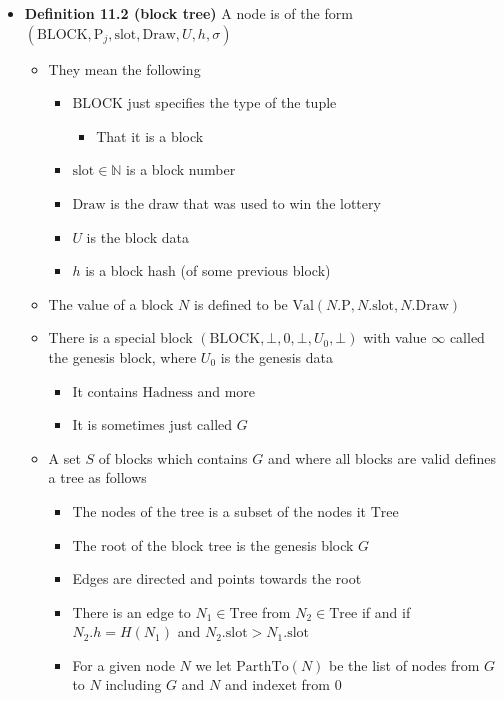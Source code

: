 \documentclass[11pt]{article}
\begin{document}
\begin{itemize}
\item \textbf{Definition 11.2 (block tree)} A node is of the form \((\text{BLOCK}, \text{P}_j, \text{slot}, \text{Draw}, U,h, \sigma)\)
\begin{itemize}
\item They mean the following
\begin{itemize}
\item \(\text{BLOCK}\) just specifies the type of the tuple
\begin{itemize}
\item That it is a block
\end{itemize}
\item \(\text{slot} \in \mathbb N\) is a block number
\item \(\text{Draw}\) is the draw that was used to win the lottery
\item \(U\) is the block data
\item \(h\) is a block hash (of some previous block)
\end{itemize}
\item The value of a block \(N\) is defined to be \(\text{Val}(N.\text{P}, N.\text{slot}, N.\text{Draw})\)
\item There is a special block \((\text{BLOCK}, \bot, 0, \bot, U_0, \bot)\) with value \(\infty\) called the genesis block, where \(U_0\) is the genesis data
\begin{itemize}
\item It contains \(\text{Hadness}\) and more
\item It is sometimes just called \(G\)
\end{itemize}
\item A set \(S\) of blocks which contains \(G\) and where all blocks are valid defines a tree as follows
\begin{itemize}
\item The nodes of the tree is a subset of the nodes it \(\text{Tree}\)
\item The root of the block tree is the genesis block \(G\)
\item Edges are directed and points towards the root
\item There is an edge to \(N_1 \in \text{Tree}\) from \(N_2 \in \text{Tree}\) if and if \(N_2.h = H(N_1)\) and \(N_2.\text{slot} > N_1.\text{slot}\)
\item For a given node \(N\) we let \(\text{ParthTo}(N)\) be the list of nodes from \(G\) to \(N\) including \(G\) and \(N\) and indexet from 0
\end{itemize}
\end{itemize}


\end{itemize}
\end{document}
